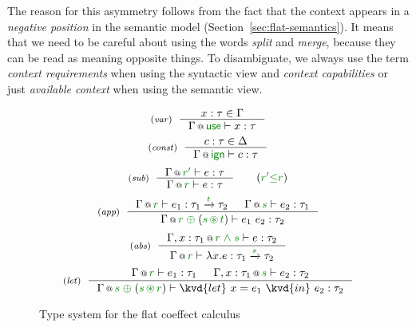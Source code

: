 The reason for this asymmetry follows from the fact that the context appears in a \emph{negative
position} in the semantic model (Section~\ref{sec:flat-semantics}). It means that we need to be
careful about using the words \emph{split} and \emph{merge}, because they can be read as meaning
opposite things. To disambiguate, we always use the term \emph{context requirements} when using
the syntactic view and \emph{context capabilities} or just \emph{available context} when using 
the semantic view.


\begin{figure}[t]
\begin{equation*}
\tyrule{var}
  {x : \tau \in \Gamma}
  {\coctx{\Gamma}{\cunit} \vdash x : \tau }
\end{equation*}
\begin{equation*}
\tyrule{const}
  {c : \tau \in \Delta}
  {\coctx{\Gamma}{\czero} \vdash c : \tau }
\end{equation*}
\begin{equation*}
\tyrule{sub}
  {\coctx{\Gamma}{\cclrd{r'}} \vdash e : \tau }
  {\coctx{\Gamma}{\cclrd{r}} \vdash e : \tau }\quad\quad(\cclrd{r'} \cleq \cclrd{r})
\end{equation*}
\begin{equation*}
\tyrule{app}
  {\coctx{\Gamma}{\cclrd{r}} \vdash e_1 : \tau_1 \xrightarrow{\cclrd{t}} \tau_2 &
   \coctx{\Gamma}{\cclrd{s}} \vdash e_2 : \tau_1 }
  {\coctx{\Gamma}{\cclrd{r} \;\cpar\; (\cclrd{s} \,\cseq\, \cclrd{t})} \vdash e_1~e_2 : \tau_2}
\end{equation*}
\begin{equation*}
\tyrule{abs}
  {\coctx{\Gamma, x:\tau_1}{\cclrd{r}\;\czip\;\cclrd{s}} \vdash e : \tau_2}
  {\coctx{\Gamma}{\cclrd{r}} \vdash \lambda x.e : \tau_1 \xrightarrow{\cclrd{s}} \tau_2 }
\end{equation*}
\begin{equation*}
\tyrule{let}
  { \coctx{\Gamma}{\cclrd{r}} \vdash e_1 : \tau_1 &
    \coctx{\Gamma, x:\tau_1}{\cclrd{s}} \vdash e_2 : \tau_2}
  {\coctx{\Gamma}{\cclrd{s} \;\cpar\; (\cclrd{s} \,\cseq\, \cclrd{r})} \vdash \kvd{let}~x=e_1~\kvd{in}~e_2 : \tau_2 }
\end{equation*}

\caption{Type system for the flat coeffect calculus}
\label{fig:flat-types}
\end{figure}

